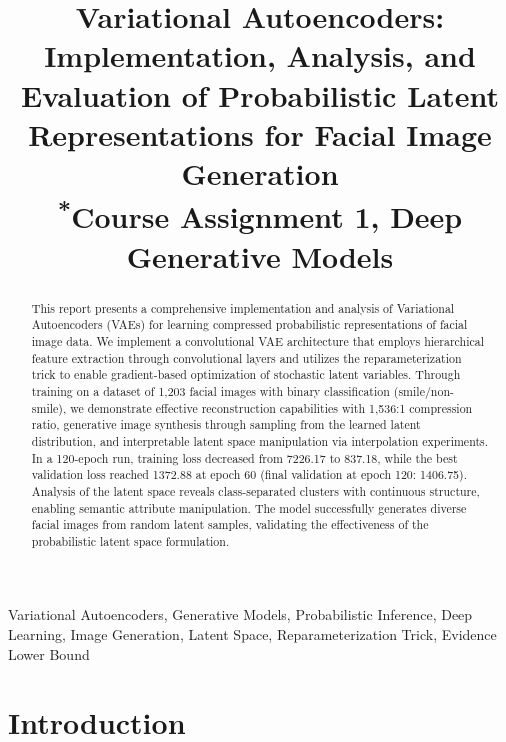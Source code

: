 \documentclass[conference]{IEEEtran}
\begin{document}
\title{Variational Autoencoders: Implementation, Analysis, and Evaluation of Probabilistic Latent Representations for Facial Image Generation\\
{\footnotesize \textsuperscript{*}Course Assignment 1, Deep Generative Models}
}

\author{
}

\maketitle

\begin{abstract}
This report presents a comprehensive implementation and analysis of Variational Autoencoders (VAEs) for learning compressed probabilistic representations of facial image data. We implement a convolutional VAE architecture that employs hierarchical feature extraction through convolutional layers and utilizes the reparameterization trick to enable gradient-based optimization of stochastic latent variables. Through training on a dataset of 1,203 facial images with binary classification (smile/non-smile), we demonstrate effective reconstruction capabilities with 1,536:1 compression ratio, generative image synthesis through sampling from the learned latent distribution, and interpretable latent space manipulation via interpolation experiments. In a 120-epoch run, training loss decreased from 7226.17 to 837.18, while the best validation loss reached 1372.88 at epoch 60 (final validation at epoch 120: 1406.75). Analysis of the latent space reveals class-separated clusters with continuous structure, enabling semantic attribute manipulation. The model successfully generates diverse facial images from random latent samples, validating the effectiveness of the probabilistic latent space formulation.
\end{abstract}

\begin{IEEEkeywords}
Variational Autoencoders, Generative Models, Probabilistic Inference, Deep Learning, Image Generation, Latent Space, Reparameterization Trick, Evidence Lower Bound
\end{IEEEkeywords}

\section{Introduction}
\end{document}
